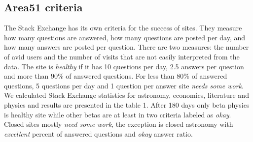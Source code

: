 \subsection{Area51 criteria}

The Stack Exchange has its own criteria for the success of sites. They measure how many questions are answered, how many questions are posted per day, and how many answers are posted per question.  There are two measures: the number of avid users and the number of visits that are not easily interpreted from the data. The site is \textit{healthy} if it has 10 questions per day, 2.5 answers per question and more than $90\%$ of answered questions. For less than $80\%$ of answered questions, 5 questions per day and 1 question per answer site \textit{needs some work}. We calculated Stack Exchange statistics for astronomy, economics, literature and physics and results are presented in the table 1. After 180 days only beta physics is healthy site while other betas are at least in two criteria labeled as \textit{okay}. Closed sites mostly \textit{need some work}, the exception is closed astronomy with \textit{excellent} percent of answered questions and \textit{okay} answer ratio. 

